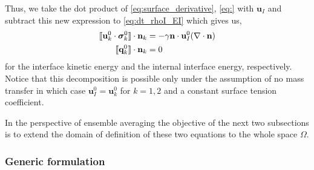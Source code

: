 Thus, we take the dot product of \ref{eq:surface_derivative}, \ref{eq:} with $\textbf{u}_I$ and subtract this new expression to \ref{eq:dt_rhoI_EI} which gives us, 
\begin{align}
    \label{eq:dt_rhoI_uI2}
    \llbracket \textbf{u}_k^0 \cdot \bm{\sigma}_k^0 \rrbracket \cdot \textbf{n}_k
    &=
    -\gamma\textbf{n}\cdot \textbf{u}_{I}^0(\mathbf{\nabla}\cdot \textbf{n})\\
    \label{eq:dt_rhoIe_I}
    \llbracket  \textbf{q}_k^0 \rrbracket \cdot \textbf{n}_k
    &= 
     0
\end{align}
for the interface kinetic energy and the internal interface energy, respectively. 
Notice that this decomposition is possible only under the assumption of no mass transfer in which case $\textbf{u}_I^0=\textbf{u}_k^0$ for $k =1,2$ and a constant surface tension coefficient.


In the perspective of ensemble averaging the objective of the next two subsections is to extend the domain of definition of these two equations to the whole space $\Omega$.


\subsubsection{Generic formulation}

